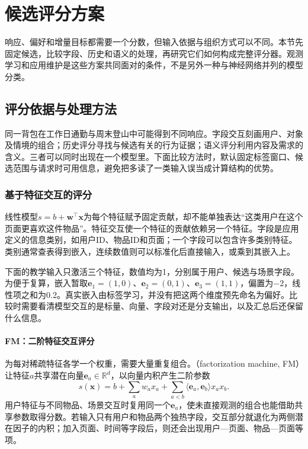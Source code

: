 \section{候选评分方案}
\label{sec:rs-scoring}

响应、偏好和增量目标都需要一个分数，但输入依据与组织方式可以不同。本节先固定候选，比较字段、历史和语义的处理，再研究它们如何构成完整评分器。观测学习和应用维护是这些方案共同面对的条件，不是另外一种与神经网络并列的模型分类。

\subsection{评分依据与处理方法}
\label{sec:rs-scoring-evidence}

同一背包在工作日通勤与周末登山中可能得到不同响应。字段交互刻画用户、对象及情境的组合；历史评分寻找与候选有关的行为证据；语义评分利用内容及需求的含义。三者可以同时出现在一个模型里。下面比较方法时，默认固定标签窗口、候选范围与请求时可用信息，避免把多读了一类输入误当成计算结构的优势。

\subsubsection{基于特征交互的评分}
\label{sec:rs-feature-interaction}

线性模型$s=b+\bm w^\top\bm x$为每个特征赋予固定贡献，却不能单独表达“这类用户在这个页面更喜欢这件物品”。特征交互使一个特征的贡献依赖另一个特征。字段是应用定义的信息类别，如用户ID、物品ID和页面；一个字段可以包含许多类别特征。类别通常查表得到嵌入，连续数值则可以标准化后直接输入，或乘到其嵌入上。

下面的教学输入只激活三个特征，数值均为1，分别属于用户、候选与场景字段。为便于复算，嵌入暂取$\bm e_1=(1,0)$、$\bm e_2=(0,1)$、$\bm e_3=(1,1)$，偏置为$-2$，线性项之和为0.2。真实嵌入由标签学习，并没有把这两个维度预先命名为偏好。比较时需要看清模型交互的是标量、向量、字段对还是分支输出，以及汇总后还保留什么信息。

\paragraph{FM：二阶特征交互评分}
\label{sec:rs-fm}

为每对稀疏特征各学一个权重，需要大量重复组合。（factorization machine, FM）让特征$a$共享潜在向量$\bm e_a\in\mathbb R^d$，以向量内积产生二阶参数
\begin{equation}
 s(\bm x)=b+\sum_a w_ax_a+
       \sum_{a<b}\langle\bm e_a,\bm e_b\rangle x_ax_b.
 \label{eq:rs-fm}
\end{equation}
用户特征与不同物品、场景交互时复用同一个$\bm e_a$，使未直接观测的组合也能借助共享参数取得分数。若输入只有用户和物品两个独热字段，交互部分就退化为两侧潜在因子的内积；加入页面、时间等字段后，则还会出现用户—页面、物品—页面等项。

